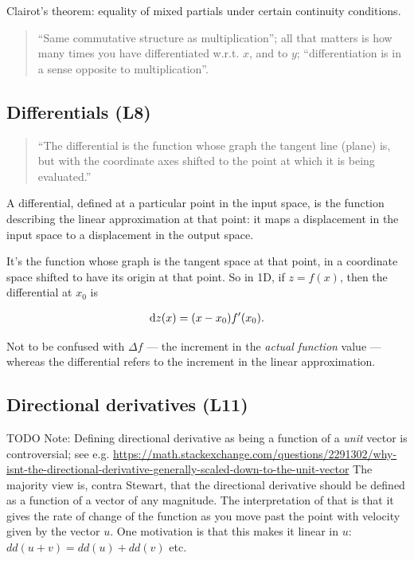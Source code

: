 Clairot's theorem: equality of mixed partials under certain continuity
conditions.

\begin{quote}
  ``Same commutative structure as multiplication''; all that matters
  is how many times you have differentiated w.r.t. $x$, and to $y$;
  ``differentiation is in a sense opposite to multiplication''.
\end{quote}

\subsection{Differentials (L8)}

\begin{quote}
  ``The differential is the function whose graph the tangent line (plane) is,
  but with the coordinate axes shifted to the point at which it is being
  evaluated.''
\end{quote}

A differential, defined at a particular point in the input space, is the
function describing the linear approximation at that point: it maps a
displacement in the input space to a displacement in the output space.

It's the function whose graph is the tangent space at that point, in a
coordinate space shifted to have its origin at that point. So in 1D, if
$z = f(x)$, then the differential at $x_0$ is

\begin{align*}
  \dz(x) = (x - x_0)f'(x_0).
\end{align*}


Not to be confused with $\Delta f$ --- the increment in the \textit{actual
  function} value --- whereas the differential refers to the increment in the
linear approximation.


\subsection{Directional derivatives (L11)}

TODO Note: Defining directional derivative as being a function of a \textit{unit} vector is
controversial; see
e.g. \url{https://math.stackexchange.com/questions/2291302/why-isnt-the-directional-derivative-generally-scaled-down-to-the-unit-vector}
The majority view is, contra Stewart, that the directional derivative should be defined as a
function of a vector of any magnitude. The interpretation of that is that it gives the rate of
change of the function as you move past the point with velocity given by the vector $u$. One
motivation is that this makes it linear in $u$: $dd(u + v) = dd(u) + dd(v)$ etc.

